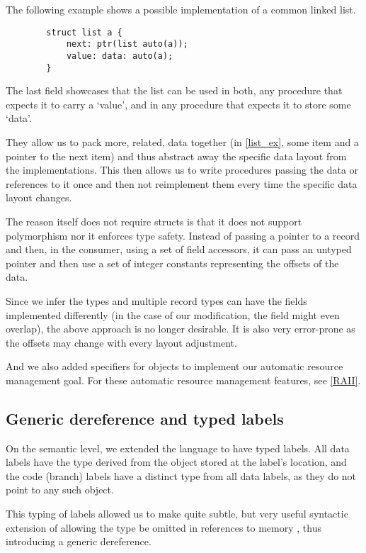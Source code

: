 \begin{ex}
    \label{list_ex}
    The following example shows a possible implementation of a common linked list.

    \begin{lstlisting}
        struct list a {
            next: ptr(list auto(a));
            value: data: auto(a);
        }
    \end{lstlisting}

    The last field showcases that the list can be used in both, any procedure that expects it to carry a `value', and in any procedure that expects it to store some `data'.
\end{ex}

They allow us to pack more, related, data together (in \cref{list_ex}, some item and a pointer to the next item) and thus abstract away the specific data layout from the implementations. This then allows us to write procedures passing the data or references to it once and then not reimplement them every time the specific data layout changes.

The reason \cmm itself does not require structs is that it does not support polymorphism nor it enforces type safety. Instead of passing a pointer to a record and then, in the consumer, using a set of field accessors, it can pass an untyped pointer and then use a set of integer constants representing the offsets of the data.

Since we infer the types and multiple record types can have the fields implemented differently (in the case of our modification, the field might even overlap), the above approach is no longer desirable. It is also very error-prone as the offsets may change with every layout adjustment.

And we also added  specifiers for  objects to implement our automatic resource management goal. For these automatic resource management features, see \cref{RAII}.

\subsection{Generic dereference and typed labels}

On the semantic level, we extended the language to have typed labels. All data labels have the type derived from the object stored at the label's location, and the code (branch) labels have a distinct type from all data labels, as they do not point to any such object.

This typing of labels allowed us to make quite subtle, but very useful syntactic extension of allowing the type be omitted in references to memory \cite{ramsey2005c}, thus introducing a generic dereference.

